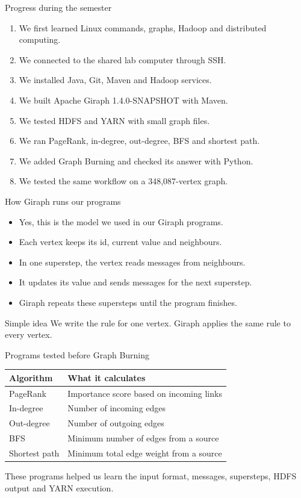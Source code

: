 \documentclass[aspectratio=169]{beamer}
\begin{document}
\begin{frame}{Progress during the semester}
\begin{enumerate}
  \item We first learned Linux commands, graphs, Hadoop and distributed computing.
  \item We connected to the shared lab computer through SSH.
  \item We installed Java, Git, Maven and Hadoop services.
  \item We built Apache Giraph 1.4.0-SNAPSHOT with Maven.
  \item We tested HDFS and YARN with small graph files.
  \item We ran PageRank, in-degree, out-degree, BFS and shortest path.
  \item We added Graph Burning and checked its answer with Python.
  \item We tested the same workflow on a 348,087-vertex graph.
\end{enumerate}
\end{frame}

\begin{frame}{How Giraph runs our programs}
\begin{itemize}
  \item Yes, this is the model we used in our Giraph programs.
  \item Each vertex keeps its id, current value and neighbours.
  \item In one superstep, the vertex reads messages from neighbours.
  \item It updates its value and sends messages for the next superstep.
  \item Giraph repeats these supersteps until the program finishes.
\end{itemize}

\vspace{0.3cm}
\begin{block}{Simple idea}
  We write the rule for one vertex. Giraph applies the same rule to every vertex.
\end{block}
\end{frame}

\begin{frame}{Programs tested before Graph Burning}
\begin{tabular}{ll}
\toprule
Algorithm & What it calculates \\
\midrule
PageRank & Importance score based on incoming links \\
In-degree & Number of incoming edges \\
Out-degree & Number of outgoing edges \\
BFS & Minimum number of edges from a source \\
Shortest path & Minimum total edge weight from a source \\
\bottomrule
\end{tabular}

\vspace{0.4cm}
These programs helped us learn the input format, messages, supersteps, HDFS output and YARN execution.
\end{frame}
\end{document}
